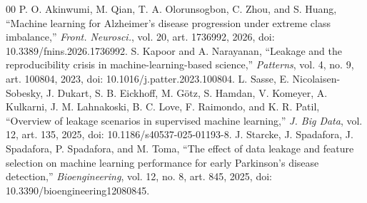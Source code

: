 \documentclass[conference]{IEEEtran}
\begin{document}
\begin{thebibliography}{00}
 P. O. Akinwumi, M. Qian, T. A. Olorunsogbon, C. Zhou, and S. Huang, ``Machine learning for Alzheimer's disease progression under extreme class imbalance,'' \textit{Front. Neurosci.}, vol. 20, art. 1736992, 2026, doi: 10.3389/fnins.2026.1736992.
 S. Kapoor and A. Narayanan, ``Leakage and the reproducibility crisis in machine-learning-based science,'' \textit{Patterns}, vol. 4, no. 9, art. 100804, 2023, doi: 10.1016/j.patter.2023.100804.
 L. Sasse, E. Nicolaisen-Sobesky, J. Dukart, S. B. Eickhoff, M. G\"otz, S. Hamdan, V. Komeyer, A. Kulkarni, J. M. Lahnakoski, B. C. Love, F. Raimondo, and K. R. Patil, ``Overview of leakage scenarios in supervised machine learning,'' \textit{J. Big Data}, vol. 12, art. 135, 2025, doi: 10.1186/s40537-025-01193-8.
 J. Starcke, J. Spadafora, J. Spadafora, P. Spadafora, and M. Toma, ``The effect of data leakage and feature selection on machine learning performance for early Parkinson's disease detection,'' \textit{Bioengineering}, vol. 12, no. 8, art. 845, 2025, doi: 10.3390/bioengineering12080845.
\end{thebibliography}
\end{document}
